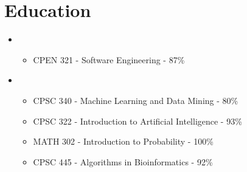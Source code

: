 \documentclass[11pt,a4paper,sans]{moderncv}        %
\begin{document}
\section{Education}
  \begin{itemize}
      \item{}
      \begin{itemize}
      \item[\raisebox{0.25ex}{\tiny$\bullet$}] CPEN 321 - Software Engineering - 87\%
      \end{itemize}\vspace{3pt}
    \item{}
      \begin{itemize}
      \item[\raisebox{0.25ex}{\tiny$\bullet$}] CPSC 340 - Machine Learning and Data Mining - 80\%
      \item[\raisebox{0.25ex}{\tiny$\bullet$}] CPSC 322 - Introduction to Artificial Intelligence - 93\%
      \item[\raisebox{0.25ex}{\tiny$\bullet$}] MATH 302 - Introduction to Probability - 100\%
      \item[\raisebox{0.25ex}{\tiny$\bullet$}] CPSC 445 - Algorithms in Bioinformatics - 92\%
      \end{itemize}\vspace{3pt}
    \end{itemize}

\end{document}
